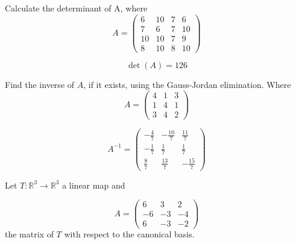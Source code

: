 \begin{questions}

\question Calculate the determinant of A, where
$$
A=\left(\begin{array}{rrrr}
6 & 10 & 7 & 6 \\
7 & 6 & 7 & 10 \\
10 & 10 & 7 & 9 \\
8 & 10 & 8 & 10
\end{array}\right)
$$

\begin{solution}
$$\det(A)=126$$
\end{solution}

\question Find the inverse of $A$, if it exists, using the Gauss-Jordan elimination. Where
$$
A=\left(\begin{array}{rrr}
4 & 1 & 3 \\
1 & 4 & 1 \\
3 & 4 & 2
\end{array}\right)
$$

\begin{solution}
$$A^{-1}=\left(\begin{array}{rrr}
-\frac{4}{7} & -\frac{10}{7} & \frac{11}{7} \\
-\frac{1}{7} & \frac{1}{7} & \frac{1}{7} \\
\frac{8}{7} & \frac{13}{7} & -\frac{15}{7}
\end{array}\right)$$
\end{solution}

\question Let $T:\mathbb{R}^3\rightarrow\mathbb{R}^3$  a linear map and
 
$$
A=\left(\begin{array}{rrr}
6 & 3 & 2 \\
-6 & -3 & -4 \\
6 & -3 & -2
\end{array}\right)
$$
the matrix of $T$ with respect to the canonical basis.
\end{questions}
